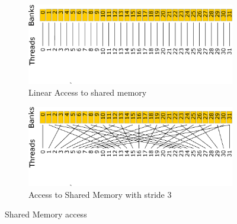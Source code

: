 \begin{figure}[h]
\centering
\begin{subfigure}{1.0\textwidth}
  \centering
  \includegraphics[width=.9\linewidth]{img/sharedMemoryLinearAccess.eps}
  \caption{Linear Access to shared memory}
  \label{fig:linearaccess}
\end{subfigure}
\begin{subfigure}{1.0\textwidth}
  \centering
  \includegraphics[width=.9\linewidth]{img/sharedMemoryStrideAccess.eps}
  \caption{Access to Shared Memory with stride 3}
  \label{fig:strideaccess}
\end{subfigure}
\caption{Shared Memory access}
\end{figure}


